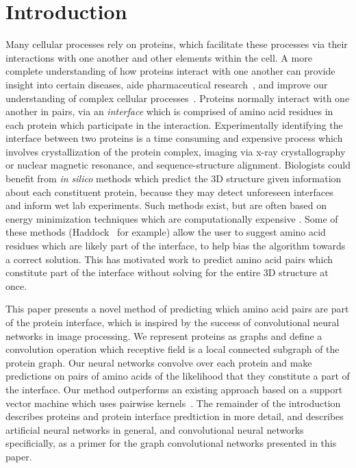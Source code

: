 \chapter{Introduction}
\label{chap:intro}

Many cellular processes rely on proteins, which facilitate these processes via their interactions with one another and other elements within the cell. 
A more complete understanding of how proteins interact with one another can provide insight into certain diseases, aide pharmaceutical research~\cite{fauman2003}, and improve our understanding of complex cellular processes~\cite{altman2003}.
Proteins normally interact with one another in pairs, via an \textit{interface} which is comprised of amino acid residues in each protein which participate in the interaction.
Experimentally identifying the interface between two proteins is a time consuming and expensive process which involves crystallization of the protein complex, imaging via x-ray crystallography or nuclear magnetic resonance, and sequence-structure alignment. 
Biologists could benefit from \textit{in silico} methods which predict the 3D structure given information about each constituent protein, because they may detect unforeseen interfaces and inform wet lab experiments.
Such methods exist, but are often based on energy minimization techniques which are computationally expensive \cite{esmaielbeiki2015}.
Some of these methods (Haddock~\cite{zundert2016} for example) allow the user to suggest amino acid residues which are likely part of the interface, to help bias the algorithm towards a correct solution.
This has motivated work to predict amino acid pairs which constitute part of the interface without solving for the entire 3D structure at once. 

This paper presents a novel method of predicting which amino acid pairs are part of the protein interface, which is inspired by the success of convolutional neural networks in image processing. 
We represent proteins as graphs and define a convolution operation which receptive field is a local connected subgraph of the protein graph.
Our neural networks convolve over each protein and make predictions on pairs of amino acids of the likelihood that they constitute a part of the interface. 
Our method outperforms an existing approach based on a support vector machine which uses pairwise kernels~\cite{minhas2014}.
The remainder of the introduction describes proteins and protein interface predtiction in more detail, and describes artificial neural networks in general, and convolutional neural networks specificially, as a primer for the graph convolutional networks presented in this paper.

